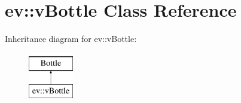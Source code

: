 \hypertarget{classev_1_1vBottle}{}\section{ev\+:\+:v\+Bottle Class Reference}
\label{classev_1_1vBottle}
Inheritance diagram for ev\+:\+:v\+Bottle\+:\begin{figure}[H]
\begin{center}
\leavevmode
\includegraphics[height=2.000000cm]{classev_1_1vBottle}
\end{center}
\end{figure}
